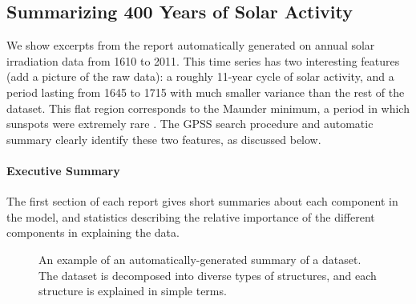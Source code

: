 \documentclass{article}
\begin{document}
\subsection{Summarizing 400 Years of Solar Activity}
\label{sec:solar}

We show excerpts from the report automatically generated on annual solar irradiation data from 1610 to 2011.
This time series has two interesting features (add a picture of the raw data): a roughly 11-year cycle of solar activity, and a period lasting from 1645 to 1715 with much smaller variance than the rest of the dataset.  This flat region corresponds to the Maunder minimum, a period in which sunspots were extremely rare \citep{lean1995reconstruction}.
%
The GPSS search procedure and automatic summary clearly identify these two features, as discussed below.

\paragraph{Executive Summary}

The first section of each report gives short summaries about each component in the model, and statistics describing the relative importance of the different components in explaining the data.

\begin{figure}[h]
\centering
{}
\caption{
An example of an automatically-generated summary of a dataset.  The dataset is decomposed into diverse types of structures, and each structure is explained in simple terms.}
\label{fig:exec}
\end{figure}
\end{document}
